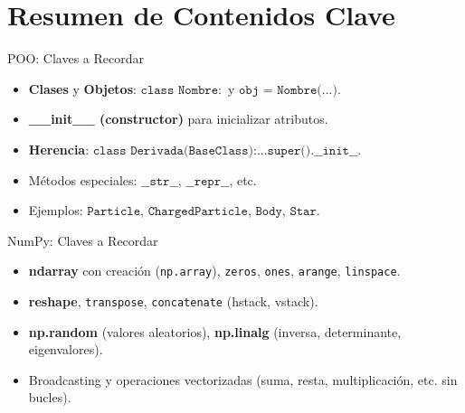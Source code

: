 \documentclass[10pt]{beamer}
\begin{document}
\section{Resumen de Contenidos Clave}

\begin{frame}{POO: Claves a Recordar}
  \begin{itemize}
    \item \textbf{Clases} y \textbf{Objetos}: \(\texttt{class Nombre}:\) y \(\texttt{obj = Nombre(...)}\).
    \item \textbf{\_\_init\_\_ (constructor)} para inicializar atributos.
    \item \textbf{Herencia}: \(\texttt{class Derivada(BaseClass):} ... \texttt{super().__init__}\).
    \item Métodos especiales: \(\texttt{\_\_str\_\_}\), \(\texttt{\_\_repr\_\_}\), etc.
    \item Ejemplos: \(\texttt{Particle}\), \(\texttt{ChargedParticle}\), \(\texttt{Body}\), \(\texttt{Star}\).
  \end{itemize}
\end{frame}

\begin{frame}{NumPy: Claves a Recordar}
  \begin{itemize}
    \item \textbf{ndarray} con creación (\texttt{np.array}), \texttt{zeros}, \texttt{ones}, \texttt{arange}, \texttt{linspace}.
    \item \textbf{reshape}, \texttt{transpose}, \texttt{concatenate} (hstack, vstack).
    \item \textbf{np.random} (valores aleatorios), \textbf{np.linalg} (inversa, determinante, eigenvalores).
    \item Broadcasting y operaciones vectorizadas (suma, resta, multiplicación, etc. sin bucles).
  \end{itemize}
\end{frame}
\end{document}
